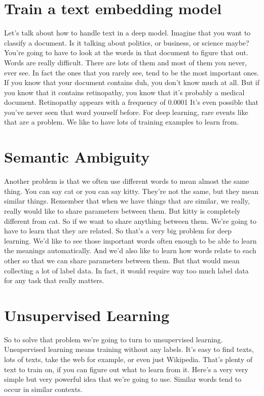 \documentclass{article}
\begin{document}
\section{Train a text embedding model}
Let's talk about how to
handle text in a deep model.
Imagine that you want
to classify a document.
Is it talking about politics,
or business, or science maybe?
You're going to have to look
at the words in that document
to figure that out.
Words are really difficult.
There are lots of them and
most of them you never, ever see.
In fact the ones that you rarely see,
tend to be the most important ones.
If you know that your document contains
duh, you don't know much at all.
But if you know that it
contains retinopathy,
you know that it's probably
a medical document.
Retinopathy appears with
a frequency of 0.0001%
It's even possible that you've never
seen that word yourself before.
For deep learning,
rare events like that are a problem.
We like to have lots of training
examples to learn from.
\section{Semantic Ambiguity}
Another problem is that we
often use different words
to mean almost the same thing.
You can say cat or you can say kitty.
They're not the same, but
they mean similar things.
Remember that when we have things
that are similar, we really,
really would like to share
parameters between them.
But kitty is completely
different from cat.
So if we want to share
anything between them.
We're going to have to learn
that they are related.
So that's a very big problem for
deep learning.
We'd like to see those
important words often enough
to be able to learn
the meanings automatically.
And we'd also like to learn how
words relate to each other so
that we can share
parameters between them.
But that would mean collecting
a lot of label data.
In fact, it would require
way too much label data for
any task that really matters.
\section{Unsupervised Learning}
So to solve that problem we're going
to turn to unsupervised learning.
Unsupervised learning means
training without any labels.
It's easy to find texts, lots of texts,
take the web for example, or
even just Wikipedia.
That's plenty of text to train on,
if you can figure out
what to learn from it.
Here's a very very simple but very
powerful idea that we're going to use.
Similar words tend to
occur in similar contexts.
\end{document}

